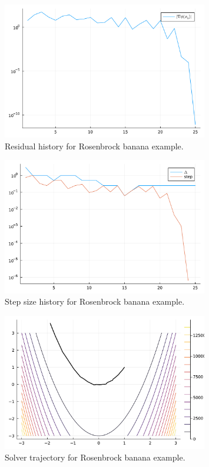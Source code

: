 \documentclass[12pt, leqno]{article} %
\begin{document}
\begin{figure}
\begin{center}
  \includegraphics[width=0.8\textwidth]{fig/2023-04-19-banana-rhist.pdf}
\end{center}
\caption{Residual history for Rosenbrock banana example.}
\label{fig:banana-rhist}
\end{figure}

\begin{figure}
\begin{center}
  \includegraphics[width=0.8\textwidth]{fig/2023-04-19-banana-dhist.pdf}
\end{center}
\caption{Step size history for Rosenbrock banana example.}
\label{fig:banana-dhist}
\end{figure}

\begin{figure}
\begin{center}
  \includegraphics[width=0.8\textwidth]{fig/2023-04-19-banana-traj.pdf}
\end{center}
\caption{Solver trajectory for Rosenbrock banana example.}
\label{fig:banana-traj}
\end{figure}
\end{document}
